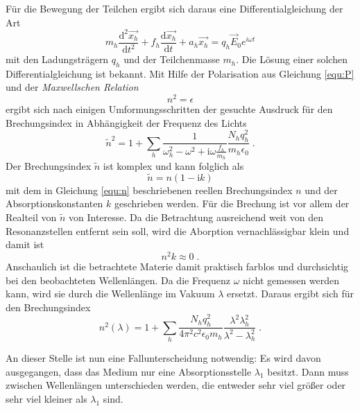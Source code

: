 Für die Bewegung der Teilchen ergibt sich daraus eine Differentialgleichung der Art
\begin{equation}
  m_h \frac{\mathrm d^2 \vec{x_h}}{\mathrm dt^2} + f_h \frac{\mathrm d \vec{x_h}}{\mathrm dt } + a_h \vec{x_h} = q_h \vec E_0 e^{i \omega t}
  \label{equ:DGL}
\end{equation}
mit den Ladungsträgern $q_h$ und der Teilchenmasse $m_h$. Die Lösung einer solchen Differentialgleichung ist bekannt. Mit Hilfe der Polarisation aus Gleichung \eqref{equ:P} und der \emph{Maxwellschen Relation}
\begin{equation}
  n^2 = \epsilon
  \label{equ:MaxwellRel}
\end{equation}
ergibt sich nach einigen Umformungsschritten der gesuchte Ausdruck für den Brechungsindex in Abhängigkeit der Frequenz des Lichts
\begin{equation}
  \tilde n^2 = 1 + \sum_{h} \frac{1}{\omega_h^2 - \omega^2 + \mathrm{i}\omega \frac{f_h}{m_h}}\frac{N_h q_h^2}{m_h \epsilon_0} \; .
  \label{equ:nkomplex}
\end{equation}
Der Brechungsindex $\tilde n$ ist komplex und kann folglich als
\begin{equation}
  \tilde n = n (1 - \mathrm{i}k)
  \label{equ:nkomplex2}
\end{equation}
mit dem in Gleichung \eqref{equ:n} beschriebenen reellen Brechungsindex $n$ und der Absorptionskonstanten $k$ geschrieben werden. Für die Brechung ist vor allem der Realteil von $\tilde n$ von Interesse. Da die Betrachtung ausreichend weit von den Resonanzstellen entfernt sein soll, wird die Aborption vernachlässigbar klein und damit ist
\begin{equation}
  n^2k \approx 0 \; .
  \label{equ:Naeherung}
\end{equation}
Anschaulich ist die betrachtete Materie damit praktisch farblos und durchsichtig bei den beobachteten Wellenlängen.
Da die Frequenz $\omega$ nicht gemessen werden kann, wird sie durch die Wellenlänge im Vakuum $\lambda$ ersetzt. Daraus ergibt sich für den Brechungsindex
\begin{equation}
  n^2(\lambda) = 1 + \sum_h \frac{N_h q_h^2}{4 \pi^2 c^2 \epsilon_0 m_h}\frac{\lambda^2\lambda_h^2}{\lambda^2 - \lambda_h^2} \; .
  \label{equ:nlambda}
\end{equation}

An dieser Stelle ist nun eine Fallunterscheidung notwendig: Es wird davon ausgegangen, dass das Medium nur eine Absorptionsstelle $\lambda_1$ besitzt. Dann muss zwischen Wellenlängen unterschieden werden, die entweder sehr viel größer oder sehr viel kleiner als $\lambda_1$ sind.

